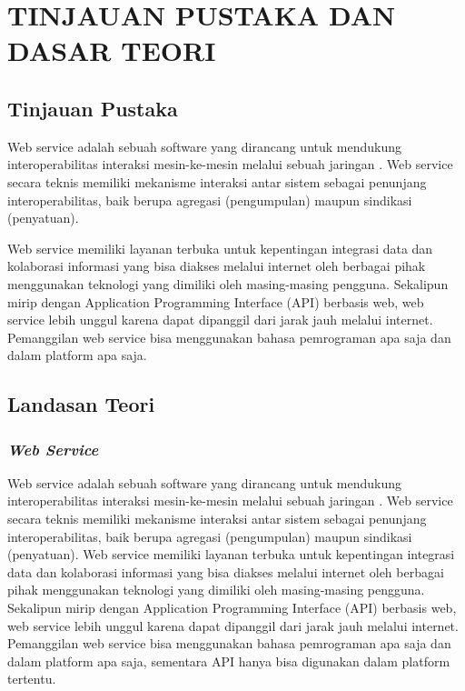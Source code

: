 \documentclass{jtetiproposalskripsi}
\begin{document}
\chapter{TINJAUAN PUSTAKA DAN DASAR TEORI}                

\section{Tinjauan Pustaka}
Web service adalah sebuah software  yang dirancang untuk mendukung interoperabilitas interaksi mesin-ke-mesin melalui sebuah jaringan .  Web service  secara teknis memiliki mekanisme interaksi antar sistem sebagai penunjang interoperabilitas, baik berupa agregasi (pengumpulan) maupun sindikasi (penyatuan).  

Web service  memiliki layanan terbuka untuk kepentingan integrasi data dan kolaborasi informasi yang bisa diakses melalui internet oleh berbagai pihak menggunakan teknologi yang dimiliki oleh masing-masing pengguna. Sekalipun mirip dengan Application Programming Interface  (API) berbasis web,  web service lebih unggul karena dapat dipanggil dari jarak jauh melalui internet. Pemanggilan web service  bisa menggunakan bahasa pemrograman apa saja dan dalam  platform apa saja.

\section{Landasan Teori}
\subsection{\emph{Web Service}}
Web service adalah sebuah software  yang dirancang untuk mendukung interoperabilitas interaksi mesin-ke-mesin melalui sebuah jaringan .  Web service  secara teknis memiliki mekanisme interaksi antar sistem sebagai penunjang interoperabilitas, baik berupa agregasi (pengumpulan) maupun sindikasi (penyatuan).  Web service  memiliki layanan terbuka untuk kepentingan integrasi data dan kolaborasi informasi yang bisa diakses melalui internet oleh berbagai pihak menggunakan teknologi yang dimiliki oleh masing-masing pengguna. Sekalipun mirip dengan Application Programming Interface  (API) berbasis web,  web service lebih unggul karena dapat dipanggil dari jarak jauh melalui internet. Pemanggilan web service  bisa menggunakan bahasa pemrograman apa saja dan dalam  platform apa saja, sementara API hanya bisa digunakan dalam  platform tertentu.
\end{document}
